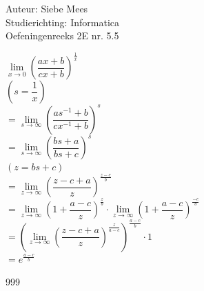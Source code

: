 \documentclass[a4paper]{article}
\begin{document}
  
\noindent \large Auteur: Siebe Mees \\
\noindent \large Studierichting: Informatica \\
\noindent \large Oefeningenreeks 2E nr. 5.5 \\

\medskip

\normalsize

$ \lim\limits_{x \rightarrow 0} \left(\dfrac{ax+b}{cx+b}\right)^{\tfrac{1}{x}} $ \\

$\left( s = \dfrac{1}{x} \right) $ \\

$ = \lim\limits_{s \rightarrow \infty} \left(\dfrac{as^{-1}+b}{cx^{-1}+b}\right)^{s} $ \\

$ = \lim\limits_{s \rightarrow \infty} \left(\dfrac{bs+a}{bs+c}\right)^{s} $ \\

$\left( z = bs + c \right) $ \\

$ = \lim\limits_{z \rightarrow \infty} \left(\dfrac{z-c+a}{z}\right)^{\tfrac{z-c}{b}} $ \\

$ = \lim\limits_{z \rightarrow \infty} \left(1+\dfrac{a-c}{z}\right)^{\tfrac{z}{b}}
\cdot
\lim\limits_{z \rightarrow \infty} \left(1+\dfrac{a-c}{z}\right)^{\tfrac{-c}{b}} $ \\

$ = \left(\lim\limits_{z \rightarrow \infty} \left(\dfrac{z-c+a}{z}\right)^{\tfrac{z}{a-c}}\right)^{\tfrac{a-c}{b}}
\cdot
1 $ \\

$= e^{\tfrac{a-c}{b}} $

\begin{thebibliography}{999}
\end{thebibliography}
\end{document}
